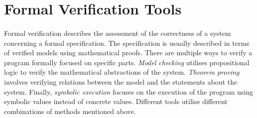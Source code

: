 \documentclass[oneside]{ecsproject}     %
\newcommand{\vref}[1]{\textit{\hyperref[#1]{#1}}}
\begin{document}








\section{Formal Verification Tools} \label{Chapter:FVT}
\paragraph*{}
Formal verification describes the assessment of the correctness of a system concerning a formal specification\cite{eth_formal_verification}. 
The specification is usually described
in terms of verified models using mathematical proofs. There are multiple ways to verify a program formally focused on specific parts. \textit{Model checking} utilises propositional logic 
to verify the mathematical abstractions of the system\cite{model_checking}. \textit{Theorem proving} involves verifying
relations between the model and the statements about the system\cite{theorem_proving}. Finally, \textit{symbolic execution} focuses
on the execution of the program using symbolic values instead of concrete values\cite{eth_formal_verification}.
Different tools utilise different combinations of methods mentioned above.
\end{document}
